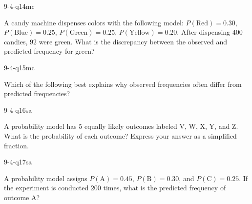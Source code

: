 \begin{practiceQuestion}{9-4-q14}{mc}
\begin{questionText}
A candy machine dispenses colors with the following model: $P(\text{Red}) = 0.30$, $P(\text{Blue}) = 0.25$, $P(\text{Green}) = 0.25$, $P(\text{Yellow}) = 0.20$. After dispensing $400$ candies, $92$ were green. What is the discrepancy between the observed and predicted frequency for green?
\end{questionText}
\end{practiceQuestion}

\begin{practiceQuestion}{9-4-q15}{mc}
\begin{questionText}
Which of the following best explains why observed frequencies often differ from predicted frequencies?
\end{questionText}
\end{practiceQuestion}


\begin{practiceQuestion}{9-4-q16}{sa}
\begin{questionText}
A probability model has $5$ equally likely outcomes labeled V, W, X, Y, and Z. What is the probability of each outcome? Express your answer as a simplified fraction.
\end{questionText}
\end{practiceQuestion}

\begin{practiceQuestion}{9-4-q17}{sa}
\begin{questionText}
A probability model assigns $P(\text{A}) = 0.45$, $P(\text{B}) = 0.30$, and $P(\text{C}) = 0.25$. If the experiment is conducted $200$ times, what is the predicted frequency of outcome A?
\end{questionText}
\end{practiceQuestion}

